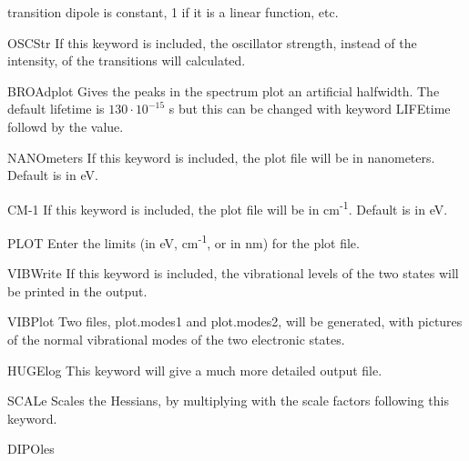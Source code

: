 \begin{keywordlist}
transition dipole is constant, 1 if it is a linear function, etc.
\item[OSCStr]
If this keyword is included, the oscillator strength, instead of the
intensity, of the transitions will calculated.
\item[BROAdplot]
Gives the peaks in the spectrum plot an artificial halfwidth. The default
lifetime is $130\cdot10^{-15}$ s but this can be changed with keyword
LIFEtime followd by the value.
\item[NANOmeters]
If this keyword is included, the plot file will be in nanometers.
Default is in eV.
\item[CM-1]
If this keyword is included, the plot file will be in
cm\textsuperscript{-1}. Default is in eV.
\item[PLOT]
Enter the limits (in eV, cm\textsuperscript{-1}, or in nm) for the plot file.
\item[VIBWrite]
If this keyword is included, the vibrational levels of the two states will
be printed in the output.
\item[VIBPlot]
Two files, plot.modes1 and plot.modes2, will be generated, with pictures of
the normal vibrational modes of the two electronic states.
\item[HUGElog]
This keyword will give a much more detailed output file.
\item[SCALe]
Scales the Hessians, by multiplying with the scale factors following this keyword.
\item[DIPOles]

\end{keywordlist}
